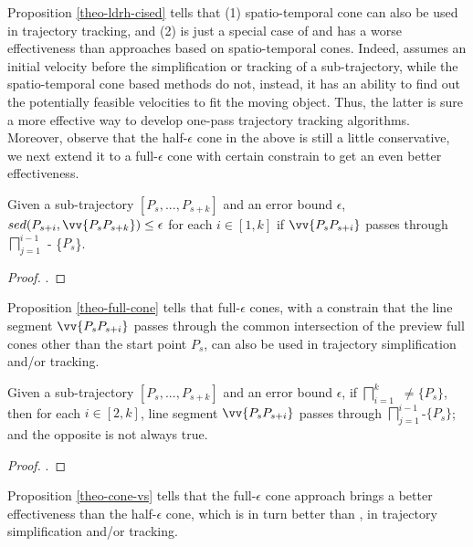 Proposition \ref{theo-ldrh-cised} tells that (1) {spatio-temporal cone can also be used in trajectory tracking}, and (2) \ldrh is just a special case of and has a worse effectiveness than approaches based on spatio-temporal cones. Indeed, \ldrh assumes an initial velocity before the simplification or tracking of a sub-trajectory, while the spatio-temporal cone based methods do not, instead, it has an ability to find out the potentially feasible velocities to fit the moving object. Thus, the latter is sure a more effective way to develop one-pass trajectory tracking algorithms. 
%
Moreover, observe that the half-$\epsilon$ cone in the above is still a little conservative, we next extend it to a full-$\epsilon$ cone with certain constrain to get an even better effectiveness.


\begin{proposition}
	\label{theo-full-cone}
	Given a sub-trajectory $[P_s,...,P_{s+k}]$ and an error bound $\epsilon$, $sed(P_{s+i}, \vv{P_sP_{s+k}})\le \epsilon$ for each $i \in [1,k]$ if $\vv{P_sP_{s+i}}$ passes through $\bigsqcap_{j=1}^{i-1}$ - \{$P_s$\}.
\end{proposition}

\begin{proof}
	\todo.
\end{proof}

Proposition \ref{theo-full-cone} tells that full-$\epsilon$ cones, with a constrain that the line segment $\vv{P_sP_{s+i}}$ passes through the common intersection of the preview full cones other than the start point $P_s$, can also be used in trajectory simplification and/or tracking. 

\begin{proposition}
	\label{theo-cone-vs}
	Given a sub-trajectory $[P_s,...,P_{s+k}]$ and an error bound $\epsilon$, if $\bigsqcap_{i=1}^{k}$ $\ne \{P_s\}$, then for each $i \in [2, k]$, line segment $\vv{P_sP_{s+i}}$ passes through $\bigsqcap_{j=1}^{i-1}$-$\{P_s\}$; and the opposite is not always true.
\end{proposition}

\begin{proof}
	\todo.
\end{proof}

Proposition \ref{theo-cone-vs} tells that the full-$\epsilon$ cone approach brings a better effectiveness than the half-$\epsilon$ cone, which is in turn better than \ldrh, in trajectory simplification and/or tracking.


